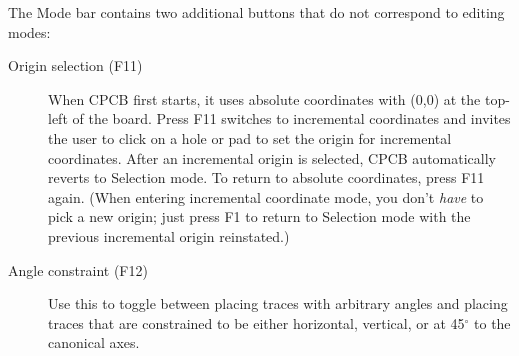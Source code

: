 \documentclass[11pt]{report}
\begin{document}
The Mode bar contains two additional buttons that do not correspond to
editing modes:
\begin{description}
      \item[Origin selection (F11)] When CPCB first starts, it uses
        absolute coordinates with (0,0) at the top-left of the
        board. Press F11 switches to incremental coordinates and
        invites the user to click on a hole or pad to set the
        origin for incremental coordinates. After an incremental
        origin is selected, CPCB automatically reverts to
        Selection mode. To return to absolute coordinates, press
        F11 again. (When entering incremental coordinate mode,
        you don't \emph{have} to pick a new origin; just press
        F1 to return to Selection mode with the previous
        incremental origin reinstated.)
      \item[Angle constraint (F12)] Use this to toggle between placing
        traces with arbitrary angles and placing traces that are
        constrained to be either horizontal, vertical, or at
        45$^\circ$ to the canonical axes.
\end{description}
\end{document}
